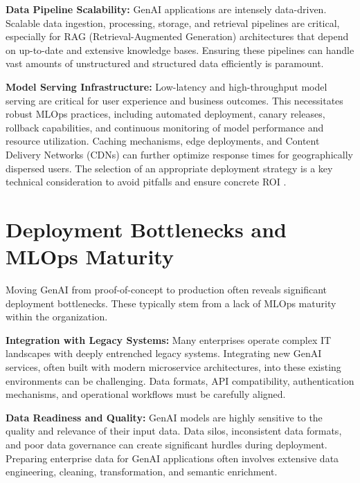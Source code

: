\documentclass[10pt,twocolumn,letterpaper]{article}
\begin{document}
\textbf{Data Pipeline Scalability:} GenAI applications are intensely data-driven. Scalable data ingestion, processing, storage, and retrieval pipelines are critical, especially for RAG (Retrieval-Augmented Generation) architectures that depend on up-to-date and extensive knowledge bases. Ensuring these pipelines can handle vast amounts of unstructured and structured data efficiently is paramount.

\textbf{Model Serving Infrastructure:} Low-latency and high-throughput model serving are critical for user experience and business outcomes. This necessitates robust MLOps practices, including automated deployment, canary releases, rollback capabilities, and continuous monitoring of model performance and resource utilization. Caching mechanisms, edge deployments, and Content Delivery Networks (CDNs) can further optimize response times for geographically dispersed users. The selection of an appropriate deployment strategy is a key technical consideration to avoid pitfalls and ensure concrete ROI \cite{openalex_w4400993506}.


\section{Deployment Bottlenecks and MLOps Maturity}


Moving GenAI from proof-of-concept to production often reveals significant deployment bottlenecks. These typically stem from a lack of MLOps maturity within the organization.

\textbf{Integration with Legacy Systems:} Many enterprises operate complex IT landscapes with deeply entrenched legacy systems. Integrating new GenAI services, often built with modern microservice architectures, into these existing environments can be challenging. Data formats, API compatibility, authentication mechanisms, and operational workflows must be carefully aligned.

\textbf{Data Readiness and Quality:} GenAI models are highly sensitive to the quality and relevance of their input data. Data silos, inconsistent data formats, and poor data governance can create significant hurdles during deployment. Preparing enterprise data for GenAI applications often involves extensive data engineering, cleaning, transformation, and semantic enrichment.
\end{document}

